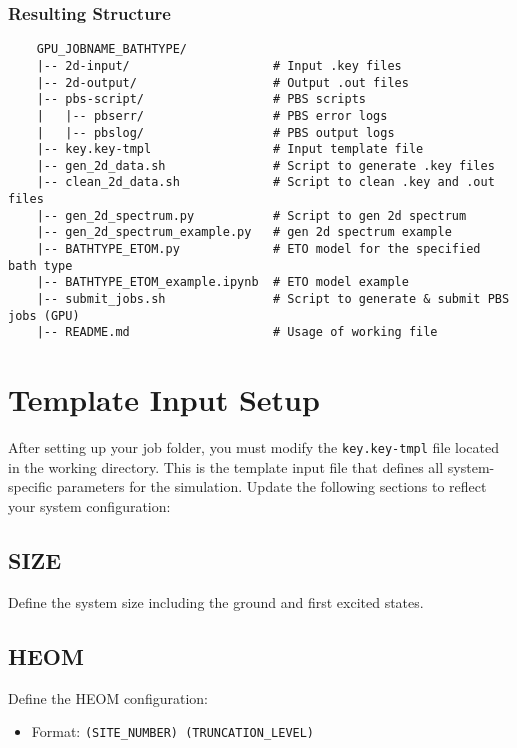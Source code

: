 \documentclass{article}
\begin{document}
\subsubsection*{Resulting Structure}
\begin{verbatim}
    GPU_JOBNAME_BATHTYPE/
    |-- 2d-input/                    # Input .key files
    |-- 2d-output/                   # Output .out files
    |-- pbs-script/                  # PBS scripts
    |   |-- pbserr/                  # PBS error logs
    |   |-- pbslog/                  # PBS output logs
    |-- key.key-tmpl                 # Input template file
    |-- gen_2d_data.sh               # Script to generate .key files
    |-- clean_2d_data.sh             # Script to clean .key and .out files
    |-- gen_2d_spectrum.py           # Script to gen 2d spectrum
    |-- gen_2d_spectrum_example.py   # gen 2d spectrum example
    |-- BATHTYPE_ETOM.py             # ETO model for the specified bath type
    |-- BATHTYPE_ETOM_example.ipynb  # ETO model example
    |-- submit_jobs.sh               # Script to generate & submit PBS jobs (GPU)
    |-- README.md                    # Usage of working file
\end{verbatim}

\newpage

\section{Template Input Setup}

After setting up your job folder, you must modify the \texttt{key.key-tmpl} file located in the working directory. This is the template input file that defines all system-specific parameters for the simulation.
Update the following sections to reflect your system configuration:

\subsection*{SIZE}
Define the system size including the ground and first excited states.

\subsection*{HEOM}
Define the HEOM configuration:
\begin{itemize}
    \item Format: \texttt{(SITE\_NUMBER) (TRUNCATION\_LEVEL)}
\end{itemize}
\end{document}
